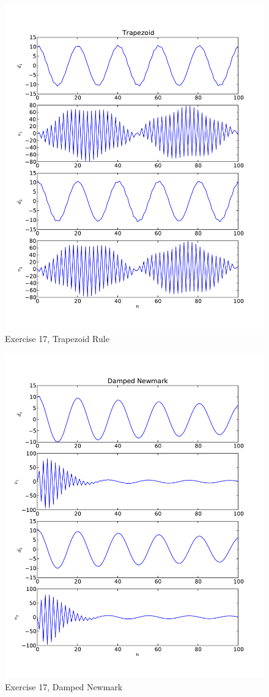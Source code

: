 \documentclass[12pt]{article}
\begin{document}
\begin{figure}[h!]
\centering
\includegraphics[height=0.9\textheight]{t2.pdf}
\caption{Exercise 17, Trapezoid Rule}
\end{figure}

\begin{figure}[h!]
\centering
\includegraphics[height=0.9\textheight]{dn2.pdf}
\caption{Exercise 17, Damped Newmark}
\end{figure}

\clearpage
\newpage

\end{document}
